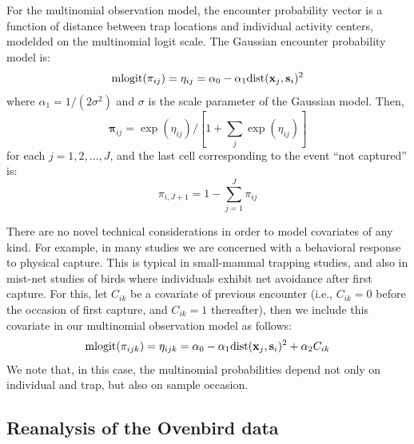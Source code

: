 For the multinomial observation model, the encounter probability
vector is a function of distance between trap locations and individual
activity centers, modelded on the multinomial logit scale. The
Gaussian encounter probability model is:
\begin{equation}
\mbox{mlogit}(\pi_{ij}) = \eta_{ij}  =  \alpha_0 - \alpha_{1} \mbox{dist}({\bf x}_{j},{\bf s}_{i})^2
\label{hscr.eq.mlogit}
\end{equation}
where $\alpha_{1} = 1/(2\sigma^2)$ and $\sigma$ is the scale
parameter of the Gaussian model. Then,
\[
{\bm \pi}_{ij} = \exp(\eta_{ij})/[ 1 + \sum_{j} \exp(\eta_{ij}) ]
\]
for each $j=1,2,\ldots,J$, and the last cell corresponding to the
event ``not captured'' is:
\[
\pi_{i,J+1} = 1- \sum_{j=1}^{J} \pi_{ij}
\]

There are no novel technical considerations in order to model
covariates of any kind.  For example, in many studies we are concerned
with a behavioral response to physical capture. This is typical in
small-mammal trapping studies, and also in mist-net studies of birds
where individuals exhibit net avoidance after first capture. For this,
let $C_{ik}$ be a covariate of previous encounter (i.e., $C_{ik} = 0$
before the occasion of first capture, and $C_{ik} = 1$ thereafter),
then we include this covariate in our multinomial observation model as
follows:
\[
\mbox{mlogit}(\pi_{ijk}) = \eta_{ijk} = \alpha_{0}  - \alpha_{1}
\mbox{dist}({\bf  x}_{j},{\bf s}_{i})^2 +  \alpha_{2} C_{ik}
\]
We note that, in this case, the multinomial probabilities depend not only
on individual and trap, but also on sample occasion.

\subsection{Reanalysis of the Ovenbird data}

